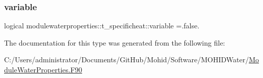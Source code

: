 \subsubsection{\texorpdfstring{variable}{variable}}
{\footnotesize\ttfamily logical modulewaterproperties\+::t\+\_\+specificheat\+::variable =.false.\hspace{0.3cm}{\ttfamily [private]}}



The documentation for this type was generated from the following file\+:\begin{DoxyCompactItemize}
\item 
C\+:/\+Users/administrator/\+Documents/\+Git\+Hub/\+Mohid/\+Software/\+M\+O\+H\+I\+D\+Water/\mbox{\hyperlink{_module_water_properties_8_f90}{Module\+Water\+Properties.\+F90}}\end{DoxyCompactItemize}
